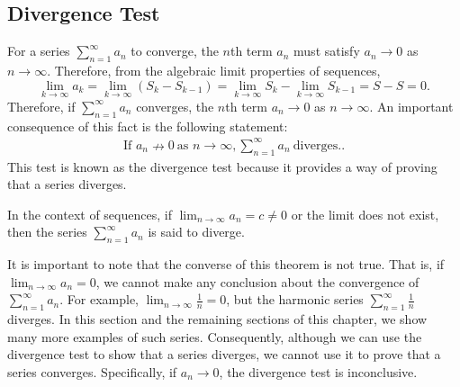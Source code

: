 \documentclass{report}
\begin{document}
    \subsection*{Divergence Test}
    \bigbreak \noindent 
    For a series $\sum_{n=1}^{\infty} a_n$ to converge, the $n$th term $a_n$ must satisfy $a_n \to 0$ as $n \to \infty$.
    \bigbreak \noindent 
    Therefore, from the algebraic limit properties of sequences,
    \[
    \lim_{k \to \infty} a_k = \lim_{k \to \infty} (S_k - S_{k-1}) = \lim_{k \to \infty} S_k - \lim_{k \to \infty} S_{k-1} = S - S = 0.
    \]
    Therefore, if $\sum_{n=1}^{\infty} a_n$ converges, the $n$th term $a_n \to 0$ as $n \to \infty$. An important consequence of this fact is the following statement:
    \begin{align*}
        \text{If } a_n \nrightarrow 0\ \text{as } n \to \infty, \sum_{n=1}^{\infty} a_n\ \text{diverges.}
    .\end{align*}
    \bigbreak \noindent 
    This test is known as the divergence test because it provides a way of proving that a series diverges.
    \bigbreak \noindent 
    \begin{thrm}
        In the context of sequences, if $\lim_{{n \to \infty}} a_n = c \neq 0$ or the limit does not exist, then the series $\sum_{{n=1}}^{\infty} a_n$ is said to diverge.
    \end{thrm}
    \bigbreak \noindent 
    It is important to note that the converse of this theorem is not true. That is, if $\lim_{n \to \infty} a_n = 0$, we cannot make any conclusion about the convergence of $\sum_{n=1}^{\infty} a_n$. For example, $\lim_{n \to \infty} \frac{1}{n} = 0$, but the harmonic series $\sum_{n=1}^{\infty} \frac{1}{n}$ diverges. In this section and the remaining sections of this chapter, we show many more examples of such series. Consequently, although we can use the divergence test to show that a series diverges, we cannot use it to prove that a series converges. Specifically, if $a_n \to 0$, the divergence test is inconclusive.

    \bigbreak \noindent 
\end{document}
